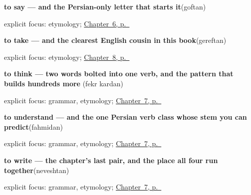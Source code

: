 \noindent\begin{minipage}[t]{\linewidth}
\raggedright
\textbf{to say — and the Persian-only letter  that starts it}\enspace\emph{}\enspace(goftan)\par
\footnotesize explicit focus: etymology; \hyperref[ch:fa-core-verbs]{Chapter~6, p.~\pageref*{ch:fa-core-verbs}}
\end{minipage}\par\smallskip

\noindent\begin{minipage}[t]{\linewidth}
\raggedright
\textbf{to take — and the clearest English cousin in this book}\enspace\emph{}\enspace(gereftan)\par
\footnotesize explicit focus: etymology; \hyperref[ch:fa-doing-verbs]{Chapter~8, p.~\pageref*{ch:fa-doing-verbs}}
\end{minipage}\par\smallskip

\noindent\begin{minipage}[t]{\linewidth}
\raggedright
\textbf{to think — two words bolted into one verb, and the pattern that builds hundreds more}\enspace\emph{ }\enspace(fekr kardan)\par
\footnotesize explicit focus: grammar, etymology; \hyperref[ch:fa-mind-verbs]{Chapter~7, p.~\pageref*{ch:fa-mind-verbs}}
\end{minipage}\par\smallskip

\noindent\begin{minipage}[t]{\linewidth}
\raggedright
\textbf{to understand — and the one Persian verb class whose stem you can predict}\enspace\emph{}\enspace(fahmidan)\par
\footnotesize explicit focus: grammar, etymology; \hyperref[ch:fa-mind-verbs]{Chapter~7, p.~\pageref*{ch:fa-mind-verbs}}
\end{minipage}\par\smallskip

\noindent\begin{minipage}[t]{\linewidth}
\raggedright
\textbf{to write — the chapter's last pair, and the place all four run together}\enspace\emph{}\enspace(neveshtan)\par
\footnotesize explicit focus: grammar, etymology; \hyperref[ch:fa-mind-verbs]{Chapter~7, p.~\pageref*{ch:fa-mind-verbs}}
\end{minipage}\par\smallskip

